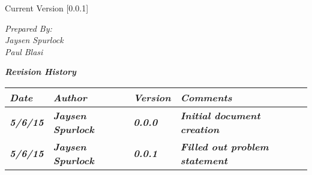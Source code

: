 
Current Version [0.0.1]
\vspace*{5mm}

{\color{MSBlue3}
\noindent
\textit{Prepared By:}\\
\textit{Jaysen Spurlock}\\
\textit{Paul Blasi}
}

\newcommand{\revision}[4]
{
    \textit{\textbf{#1}}
    & \textit{\textbf{#2}}
    & \textit{\textbf{#3}}
    & \textit{\textbf{#4}}
    \tabularnewline\hline
}

\vfill
\noindent
{\color{color02} \textit{\textbf{Revision History}}}\\
\begin{tabular}{|>{\raggedright}p{1.5cm}
                |>{\raggedright}p{3cm}
                |>{\raggedright}p{1.5cm}
                |>{\raggedright}p{9cm}
                |}
\hline

\revision{Date}{Author}{Version}{Comments}
\revision{5/6/15}{Jaysen Spurlock}{0.0.0}{Initial document creation}
\revision{5/6/15}{Jaysen Spurlock}{0.0.1}{Filled out problem statement}
\end{tabular}
\vfill

